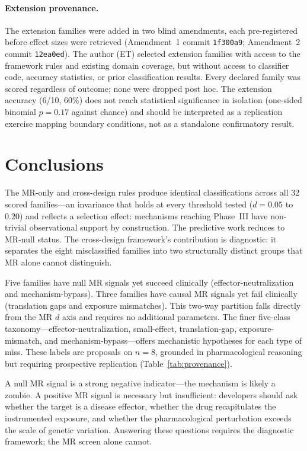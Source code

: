\documentclass[11pt]{article}
\begin{document}
\paragraph{Extension provenance.} The extension families were added in two blind amendments, each pre-registered before effect sizes were retrieved (Amendment~1 commit \texttt{1f300a9}; Amendment~2 commit \texttt{12ea0ed}). The author (ET) selected extension families with access to the framework rules and existing domain coverage, but without access to classifier code, accuracy statistics, or prior classification results. Every declared family was scored regardless of outcome; none were dropped post hoc. The extension accuracy (6/10, 60\%) does not reach statistical significance in isolation (one-sided binomial $p = 0.17$ against chance) and should be interpreted as a replication exercise mapping boundary conditions, not as a standalone confirmatory result.

\section{Conclusions}

The MR-only and cross-design rules produce identical classifications across all 32 scored families---an invariance that holds at every threshold tested ($d = 0.05$ to $0.20$) and reflects a selection effect: mechanisms reaching Phase~III have non-trivial observational support by construction. The predictive work reduces to MR-null status. The cross-design framework's contribution is diagnostic: it separates the eight misclassified families into two structurally distinct groups that MR alone cannot distinguish.

Five families have null MR signals yet succeed clinically (effector-neutralization and mechanism-bypass). Three families have causal MR signals yet fail clinically (translation gaps and exposure mismatches). This two-way partition falls directly from the MR $d$ axis and requires no additional parameters. The finer five-class taxonomy---effector-neutralization, small-effect, translation-gap, exposure-mismatch, and mechanism-bypass---offers mechanistic hypotheses for each type of miss. These labels are proposals on $n = 8$, grounded in pharmacological reasoning but requiring prospective replication (Table~\ref{tab:provenance}).

A null MR signal is a strong negative indicator---the mechanism is likely a zombie. A positive MR signal is necessary but insufficient: developers should ask whether the target is a disease effector, whether the drug recapitulates the instrumented exposure, and whether the pharmacological perturbation exceeds the scale of genetic variation. Answering these questions requires the diagnostic framework; the MR screen alone cannot.
\end{document}
